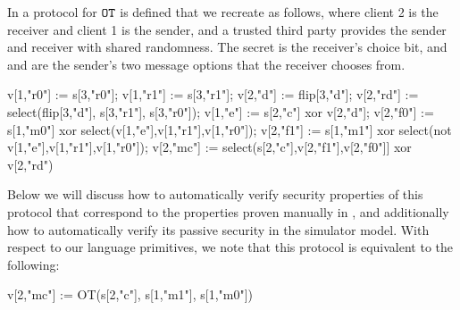 \begin{example}
  \label{example-OT}
  In \cite{barthe2019probabilistic} a protocol for $\texttt{OT}$ is
  defined that we recreate as follows, where client 2 is the receiver
  and client 1 is the sender, and a trusted third party provides the
  sender and receiver with shared randomness. The secret 
  is the receiver's choice bit, and  and 
  are the sender's two message options that the receiver chooses from. 
\begin{verbatimtab}
  v[1,"r0"] := s[3,"r0"];
  v[1,"r1"] := s[3,"r1"];
  v[2,"d"] := flip[3,"d"];
  v[2,"rd"] := select(flip[3,"d"], s[3,"r1"], s[3,"r0"]);
  v[1,"e"] := s[2,"c"] xor v[2,"d"];
  v[2,"f0"] := s[1,"m0"] xor select(v[1,"e"],v[1,"r1"],v[1,"r0"]);
  v[2,"f1"] := s[1,"m1"] xor select(not v[1,"e"],v[1,"r1"],v[1,"r0"]);
  v[2,"mc"] := select(s[2,"c"],v[2,"f1"],v[2,"f0"]] xor v[2,"rd")
\end{verbatimtab}
Below we will discuss how to automatically verify security properties
of this protocol that correspond to the properties proven manually in
\cite{barthe2019probabilistic}, and additionally how to automatically
verify its passive security in the simulator model. With respect to
our language primitives, we note that this protocol is equivalent to
the following:
\begin{verbatimtab}  
  v[2,"mc"] := OT(s[2,"c"], s[1,"m1"], s[1,"m0"])
\end{verbatimtab}
\end{example}

